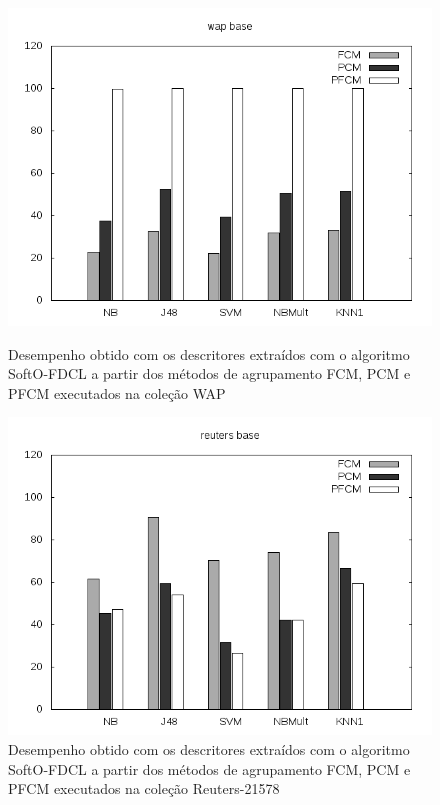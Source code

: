 \begin{figure}[!htp] \centering 
   \begin{minipage}{0.45\textwidth} 
     \centering
    \includegraphics[width=1.0\columnwidth]{assets/pfcm/wap} 
    \caption{Desempenho obtido com os descritores extraídos com o algoritmo SoftO-FDCL a partir dos
      métodos de agrupamento FCM,
    PCM e PFCM executados na coleção WAP} 
    \label{fig:pfcmwap}
  \end{minipage}\hfill 
  \begin{minipage}{0.45\textwidth} \centering
    \includegraphics[width=1.0\columnwidth]{assets/pfcm/reuters} 
    \caption{Desempenho obtido com os descritores extraídos com o algoritmo SoftO-FDCL a partir dos
      métodos de agrupamento FCM,
    PCM e PFCM executados na coleção Reuters-21578} 
     \label{fig:pfcmreuters} 
   \end{minipage} 
\end{figure}


